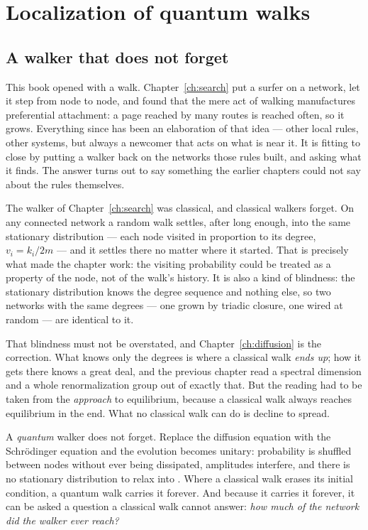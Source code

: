 \chapter{Localization of quantum walks}
\label{ch:quantum}

\section{A walker that does not forget}

This book opened with a walk. Chapter~\ref{ch:search} put a surfer on a network,
let it step from node to node, and found that the mere act of walking manufactures
preferential attachment: a page reached by many routes is reached often, so it
grows. Everything since has been an elaboration of that idea --- other local rules,
other systems, but always a newcomer that acts on what is near it. It is fitting to
close by putting a walker back on the networks those rules built, and asking what
it finds. The answer turns out to say something the earlier chapters could not say
about the rules themselves.

The walker of Chapter~\ref{ch:search} was classical, and classical walkers forget.
On any connected network a random walk settles, after long enough, into the same
stationary distribution --- each node visited in proportion to its degree, $v_i =
k_i/2m$ --- and it settles there no matter where it started. That is precisely what
made the chapter work: the visiting probability could be treated as a property of
the node, not of the walk's history. It is also a kind of blindness: the stationary
distribution knows the degree sequence and nothing else, so two networks with the
same degrees --- one grown by triadic closure, one wired at random --- are identical
to it.

That blindness must not be overstated, and Chapter~\ref{ch:diffusion} is the
correction. What knows only the degrees is where a classical walk \emph{ends up};
how it gets there knows a great deal, and the previous chapter read a spectral
dimension and a whole renormalization group out of exactly that. But the reading had
to be taken from the \emph{approach} to equilibrium, because a classical walk always
reaches equilibrium in the end. What no classical walk can do is decline to spread.

A \emph{quantum} walker does not forget. Replace the diffusion equation with the
Schr\"odinger equation and the evolution becomes unitary: probability is shuffled
between nodes without ever being dissipated, amplitudes interfere, and there is no
stationary distribution to relax into \citep{farhi1998,kempe2003,mulken2011}. Where
a classical walk erases its initial condition, a quantum walk carries it forever.
And because it carries it forever, it can be asked a question a classical walk
cannot answer: \emph{how much of the network did the walker ever reach?}

